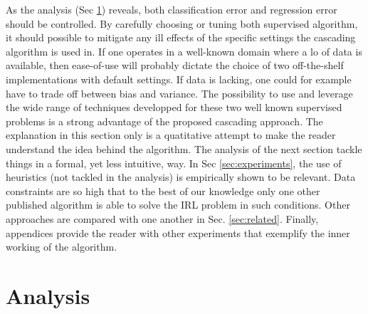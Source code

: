 \documentclass[smallextended]{svjour3}
\begin{document}
As the analysis (Sec \ref{sec:analysis}) reveals, both classification error and regression error should be controlled. By carefully choosing or tuning both supervised algorithm, it should possible to mitigate any ill effects of the specific settings the cascading algorithm is used in. If one operates in a well-known domain where a lo of data is available, then ease-of-use will probably dictate the choice of two off-the-shelf implementations with default settings. If data is lacking, one could for example have to trade off between bias and variance. The possibility to use and leverage the wide range of techniques developped for these two well known supervised problems is a strong advantage of the proposed cascading approach.
The explanation in this section only is a quatitative attempt to make the reader understand the idea behind the algorithm. The analysis of the next section tackle things in a formal, yet less intuitive, way. In Sec \ref{sec:experiments}, the use of heuristics (not tackled in the analysis) is empirically shown to be relevant. Data constraints are so high that to the best of our knowledge only one other published algorithm is able to solve the IRL problem in such conditions. Other approaches are compared with one another in Sec. \ref{sec:related}. Finally, appendices provide the reader with other experiments that exemplify the inner working of the algorithm.

\section{Analysis}
\label{sec:analysis}


\end{document}
